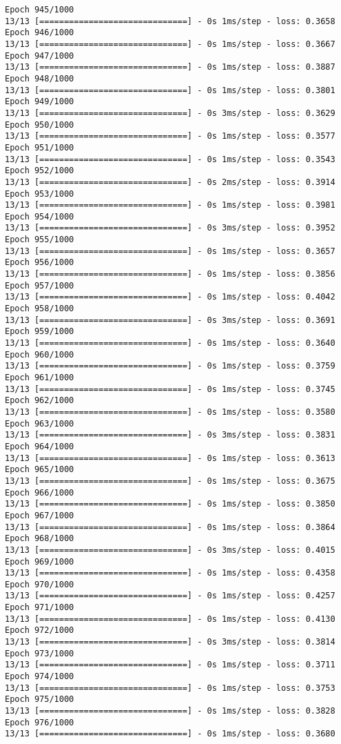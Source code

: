 \documentclass[11pt]{article}
\begin{document}
\begin{Verbatim}[commandchars=\\\{\}]
Epoch 945/1000
13/13 [==============================] - 0s 1ms/step - loss: 0.3658
Epoch 946/1000
13/13 [==============================] - 0s 1ms/step - loss: 0.3667
Epoch 947/1000
13/13 [==============================] - 0s 1ms/step - loss: 0.3887
Epoch 948/1000
13/13 [==============================] - 0s 1ms/step - loss: 0.3801
Epoch 949/1000
13/13 [==============================] - 0s 3ms/step - loss: 0.3629
Epoch 950/1000
13/13 [==============================] - 0s 1ms/step - loss: 0.3577
Epoch 951/1000
13/13 [==============================] - 0s 1ms/step - loss: 0.3543
Epoch 952/1000
13/13 [==============================] - 0s 2ms/step - loss: 0.3914
Epoch 953/1000
13/13 [==============================] - 0s 1ms/step - loss: 0.3981
Epoch 954/1000
13/13 [==============================] - 0s 3ms/step - loss: 0.3952
Epoch 955/1000
13/13 [==============================] - 0s 1ms/step - loss: 0.3657
Epoch 956/1000
13/13 [==============================] - 0s 1ms/step - loss: 0.3856
Epoch 957/1000
13/13 [==============================] - 0s 1ms/step - loss: 0.4042
Epoch 958/1000
13/13 [==============================] - 0s 3ms/step - loss: 0.3691
Epoch 959/1000
13/13 [==============================] - 0s 1ms/step - loss: 0.3640
Epoch 960/1000
13/13 [==============================] - 0s 1ms/step - loss: 0.3759
Epoch 961/1000
13/13 [==============================] - 0s 1ms/step - loss: 0.3745
Epoch 962/1000
13/13 [==============================] - 0s 1ms/step - loss: 0.3580
Epoch 963/1000
13/13 [==============================] - 0s 3ms/step - loss: 0.3831
Epoch 964/1000
13/13 [==============================] - 0s 1ms/step - loss: 0.3613
Epoch 965/1000
13/13 [==============================] - 0s 1ms/step - loss: 0.3675
Epoch 966/1000
13/13 [==============================] - 0s 1ms/step - loss: 0.3850
Epoch 967/1000
13/13 [==============================] - 0s 1ms/step - loss: 0.3864
Epoch 968/1000
13/13 [==============================] - 0s 3ms/step - loss: 0.4015
Epoch 969/1000
13/13 [==============================] - 0s 1ms/step - loss: 0.4358
Epoch 970/1000
13/13 [==============================] - 0s 1ms/step - loss: 0.4257
Epoch 971/1000
13/13 [==============================] - 0s 1ms/step - loss: 0.4130
Epoch 972/1000
13/13 [==============================] - 0s 3ms/step - loss: 0.3814
Epoch 973/1000
13/13 [==============================] - 0s 1ms/step - loss: 0.3711
Epoch 974/1000
13/13 [==============================] - 0s 1ms/step - loss: 0.3753
Epoch 975/1000
13/13 [==============================] - 0s 1ms/step - loss: 0.3828
Epoch 976/1000
13/13 [==============================] - 0s 1ms/step - loss: 0.3680

\end{Verbatim}
\end{document}

